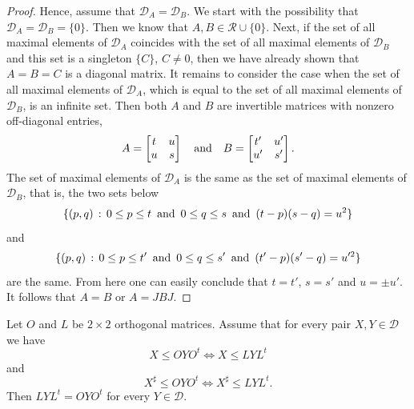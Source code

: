 \documentclass{article}
\begin{document}
\begin{proof}
Hence, assume that $\mathcal{D}_A = \mathcal{D}_B$. We start with the possibility that  $\mathcal{D}_A = \mathcal{D}_B = \{ 0 \}$. Then we know that 
$A,B \in \mathcal{R} \cup \{ 0 \}$. Next, if the set of all maximal elements of $\mathcal{D}_A$ coincides with the set of all maximal elements of $\mathcal{D}_B$ and this set is a singleton $\{ C \}$, $C\not= 0$, then we have already shown that $A=B=C$ is a diagonal matrix. It remains to consider the case when the set of all maximal elements of
$\mathcal{D}_A$, which is equal to  the set of all maximal elements of
$\mathcal{D}_B$, is an infinite set. Then both $A$ and $B$ are invertible matrices with nonzero off-diagonal entries,
$$
A =  \left[ \begin{matrix} t& u \cr u & s \cr \end{matrix} \right] \ \ \ {\rm and} \ \ \ B =  \left[ \begin{matrix} t'& u' \cr u' & s' \cr \end{matrix} \right].
$$
The set of maximal elements of $\mathcal{D}_A$ is the same as the set 
of maximal elements of $\mathcal{D}_B$, that is, the two sets below
$$
\{ (p,q)\, : \, 0\le p \le t \ \, {\rm and} \ \, 0 \le q \le s \ \, {\rm and} \ \, (t-p)(s-q) = u^2  \}$$ and $$
\{ (p,q)\, : \, 0\le p \le t' \ \, {\rm and} \ \, 0 \le q \le s' \ \, {\rm and} \ \, (t'-p)(s'-q) = u'^2  \} 
$$
are the same. From here one can easily conclude that $t=t'$, $s=s'$ and $u = \pm u'$. It follows that $A=B$ or $A = JBJ$.
\end{proof}


\begin{lemma}\label{twocompare}
Let $O$ and $L$ be $2\times 2$ orthogonal matrices. Assume that 
for every pair $X,Y \in \mathcal{D}$ we have
\begin{equation}\label{jeb1}
X\le OYO^t \iff  X \le LYL^t 
\end{equation}
and
\begin{equation}\label{jeb2}
X^\sharp \le OYO^t \iff  X^\sharp \le LYL^t .
\end{equation}
Then $LYL^t = OYO^t$ for every $Y \in \mathcal{D}$.
\end{lemma}
\end{document}

